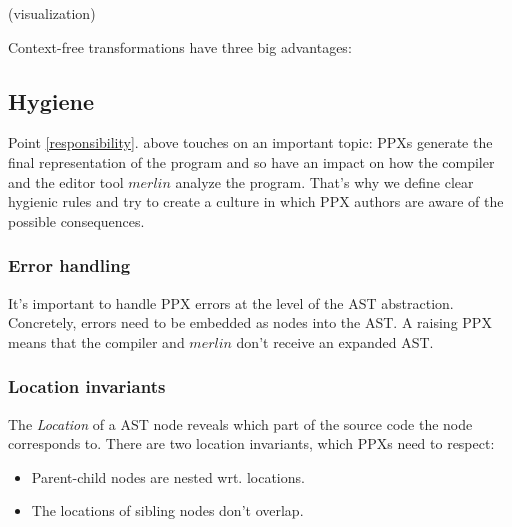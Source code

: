 \documentclass[10pt, a4paper, twocolumn]{article}
\begin{document}
(visualization)

\vspace{25pt}

Context-free transformations have three big advantages:

\subsection{Hygiene}

Point \ref{responsibility}. above touches on an important topic: PPXs generate
the final representation of the program and so have an impact on how the
compiler and the editor tool $merlin$ analyze the program. That's why we define
clear hygienic rules\cite{hygiene} and try to create a culture in which PPX
authors are aware of the possible consequences.

\subsubsection*{Error handling}

It's important to handle PPX errors at the level of the AST abstraction.
Concretely, errors need to be embedded as nodes into the AST. A raising PPX
means that the compiler and $merlin$ don't receive an expanded AST.

\subsubsection*{Location invariants}

The \emph{Location} of a AST node reveals which part of the source code the node
corresponds to.
There are two location invariants, which PPXs need to respect:
\begin{itemize}
\item Parent-child nodes are nested wrt. locations.
\item The locations of sibling nodes don't overlap.
\end{itemize}
\end{document}
